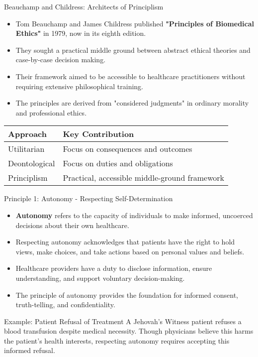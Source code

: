 \documentclass{beamer}
\begin{document}
	\begin{frame}{Beauchamp and Childress: Architects of Principlism}
		\begin{itemize}
			\item Tom Beauchamp and James Childress published \textbf{"Principles of Biomedical Ethics"} in 1979, now in its eighth edition.
			\item They sought a practical middle ground between abstract ethical theories and case-by-case decision making.
			\item Their framework aimed to be accessible to healthcare practitioners without requiring extensive philosophical training.
			\item The principles are derived from "considered judgments" in ordinary morality and professional ethics.
		\end{itemize}
		
		\begin{table}
			\begin{tabular}{l|l}
				\textbf{Approach} & \textbf{Key Contribution} \\
				\hline
				Utilitarian & Focus on consequences and outcomes \\
				Deontological & Focus on duties and obligations \\
				Principlism & Practical, accessible middle-ground framework \\
			\end{tabular}
		\end{table}
	\end{frame}
	
	\begin{frame}{Principle 1: Autonomy - Respecting Self-Determination}
		\begin{itemize}
			\item \textbf{Autonomy} refers to the capacity of individuals to make informed, uncoerced decisions about their own healthcare.
			\item Respecting autonomy acknowledges that patients have the right to hold views, make choices, and take actions based on personal values and beliefs.
			\item Healthcare providers have a duty to disclose information, ensure understanding, and support voluntary decision-making.
			\item The principle of autonomy provides the foundation for informed consent, truth-telling, and confidentiality.
		\end{itemize}
		
		\begin{exampleblock}{Example: Patient Refusal of Treatment}
			A Jehovah's Witness patient refuses a blood transfusion despite medical necessity. Though physicians believe this harms the patient's health interests, respecting autonomy requires accepting this informed refusal.
		\end{exampleblock}
	\end{frame}
	
\end{document}
